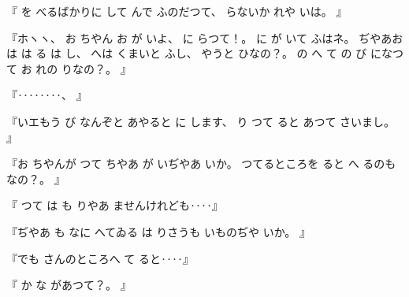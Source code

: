 %
『
を
べるばかりに
して
んで
ふのだつて、
%
らないか
れや
いは。
』

%
『ホヽヽ、
%
お
ちやん
お
が
いよ、
%
に
らつて！。
%
に
が
いて
ふはネ。
%
ぢやあお
は
は
る
は
し、
%
へは
くまいと
ふし、
%
やうと
ひなの？。
%
の
へ
て
の
び
になつて
お
れの
りなの？。
』

%
『‥‥‥‥、
』

%
『いエもう
び
なんぞと
あやると
に
します、
%
り
つて
ると
あつて
さいまし。
』

%
『お
ちやんが
つて
ちやあ
が
いぢやあ
いか。
%
つてるところを
ると
へ
るのも
なの？。
』

%
『
つて
は
も
りやあ
ませんけれども‥‥』

%
『ぢやあ
も
なに
へてゐる
は
りさうも
いものぢや
いか。
』

%
『でも
さんのところへ
て
ると‥‥』

%
『
か
な
があつて？。
』

